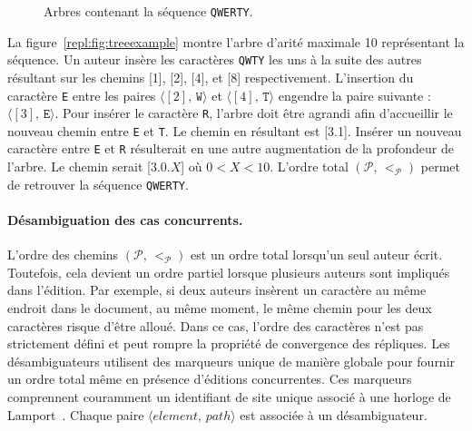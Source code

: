 \begin{figure}
  \centering
  \hspace{20pt}
  \caption[Arbres contenant une séquence répliquée]
  {Arbres contenant la séquence \texttt{QWERTY}.}
\end{figure}

La figure~\ref{repl:fig:treeexample} montre l'arbre d'arité maximale 10
représentant la séquence. Un auteur insère les caractères \texttt{QWTY} les uns
à la suite des autres résultant sur les chemins [1], [2], [4], et [8]
respectivement. L'insertion du caractère \texttt{E} entre les paires
$\langle [2],\, \texttt{W} \rangle$ et $\langle [4],\, \texttt{T} \rangle$
engendre la paire suivante : $\langle [3],\, \texttt{E} \rangle$. Pour insérer
le caractère \texttt{R}, l'arbre doit être agrandi afin d'accueillir le nouveau
chemin entre \texttt{E} et \texttt{T}. Le chemin en résultant est [3.1]. Insérer
un nouveau caractère entre \texttt{E} et \texttt{R} résulterait en une autre
augmentation de la profondeur de l'arbre. Le chemin serait [3.0.$X$] où
$0<X<10$. L'ordre total $(\mathcal{P},\, <_\mathcal{P})$ permet de retrouver la
séquence \texttt{QWERTY}.


\paragraph{Désambiguation des cas concurrents.}

L'ordre des chemins $(\mathcal{P},\, <_\mathcal{P})$ est un ordre total
lorsqu'un seul auteur écrit. Toutefois, cela devient un ordre partiel lorsque
plusieurs auteurs sont impliqués dans l'édition. Par exemple, si deux auteurs
insèrent un caractère au même endroit dans le document, au même moment, le même
chemin pour les deux caractères risque d'être alloué. Dans ce cas, l'ordre des
caractères n'est pas strictement défini et peut rompre la propriété de
convergence des répliques. Les désambiguateurs utilisent des marqueurs unique de
manière globale pour fournir un ordre total même en présence d'éditions
concurrentes. Ces marqueurs comprennent couramment un identifiant de site unique
associé à une horloge de Lamport~\cite{lamport1978time}. Chaque paire
$\langle element,\, path\rangle$ est associée à un désambiguateur.

